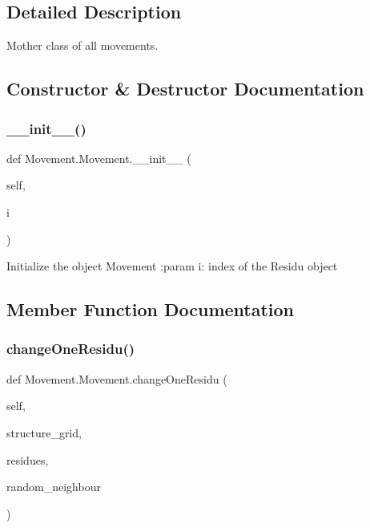 \subsection{Detailed Description}
\begin{DoxyVerb}Mother class of all movements.
\end{DoxyVerb}
 

\subsection{Constructor \& Destructor Documentation}
\mbox{\label{classMovement_1_1Movement_a30e499b5ab0257aac5ee77dc24c161b5}} 
\subsubsection{\texorpdfstring{\+\_\+\+\_\+init\+\_\+\+\_\+()}{\_\_init\_\_()}}
{\footnotesize\ttfamily def Movement.\+Movement.\+\_\+\+\_\+init\+\_\+\+\_\+ (\begin{DoxyParamCaption}\item[{}]{self,  }\item[{}]{i }\end{DoxyParamCaption})}

\begin{DoxyVerb}Initialize the object Movement
    :param   i: index of the Residu object
\end{DoxyVerb}
 

\subsection{Member Function Documentation}
\mbox{\label{classMovement_1_1Movement_ac3dec9f23b8e853ac5101535ee804767}} 
\subsubsection{\texorpdfstring{change\+One\+Residu()}{changeOneResidu()}}
{\footnotesize\ttfamily def Movement.\+Movement.\+change\+One\+Residu (\begin{DoxyParamCaption}\item[{}]{self,  }\item[{}]{structure\+\_\+grid,  }\item[{}]{residues,  }\item[{}]{random\+\_\+neighbour }\end{DoxyParamCaption})}

